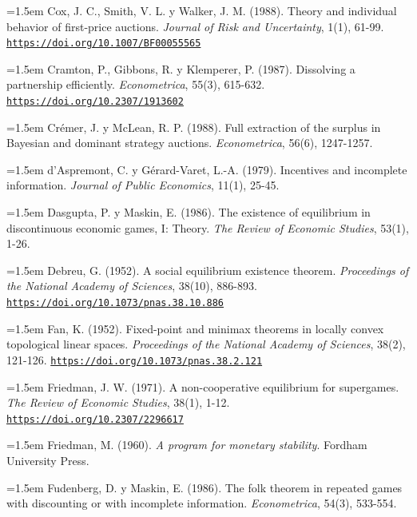 \documentclass[10pt,a4paper]{article}
\begin{document}
\noindent\hangindent=1.5em Cox, J. C., Smith, V. L. y Walker, J. M. (1988). Theory and individual behavior of first-price auctions. \textit{Journal of Risk and Uncertainty}, 1(1), 61-99. \href{https://doi.org/10.1007/BF00055565}{\nolinkurl{https://doi.org/10.1007/BF00055565}}

\noindent\hangindent=1.5em Cramton, P., Gibbons, R. y Klemperer, P. (1987). Dissolving a partnership efficiently. \textit{Econometrica}, 55(3), 615-632. \href{https://doi.org/10.2307/1913602}{\nolinkurl{https://doi.org/10.2307/1913602}}

\noindent\hangindent=1.5em Crémer, J. y McLean, R. P. (1988). Full extraction of the surplus in Bayesian and dominant strategy auctions. \textit{Econometrica}, 56(6), 1247-1257.

\noindent\hangindent=1.5em d’Aspremont, C. y Gérard-Varet, L.-A. (1979). Incentives and incomplete information. \textit{Journal of Public Economics}, 11(1), 25-45.

\noindent\hangindent=1.5em Dasgupta, P. y Maskin, E. (1986). The existence of equilibrium in discontinuous economic games, I: Theory. \textit{The Review of Economic Studies}, 53(1), 1-26.

\noindent\hangindent=1.5em Debreu, G. (1952). A social equilibrium existence theorem. \textit{Proceedings of the National Academy of Sciences}, 38(10), 886-893. \href{https://doi.org/10.1073/pnas.38.10.886}{\nolinkurl{https://doi.org/10.1073/pnas.38.10.886}}

\noindent\hangindent=1.5em Fan, K. (1952). Fixed-point and minimax theorems in locally convex topological linear spaces. \textit{Proceedings of the National Academy of Sciences}, 38(2), 121-126. \href{https://doi.org/10.1073/pnas.38.2.121}{\nolinkurl{https://doi.org/10.1073/pnas.38.2.121}}

\noindent\hangindent=1.5em Friedman, J. W. (1971). A non-cooperative equilibrium for supergames. \textit{The Review of Economic Studies}, 38(1), 1-12. \href{https://doi.org/10.2307/2296617}{\nolinkurl{https://doi.org/10.2307/2296617}}

\noindent\hangindent=1.5em Friedman, M. (1960). \textit{A program for monetary stability}. Fordham University Press.

\noindent\hangindent=1.5em Fudenberg, D. y Maskin, E. (1986). The folk theorem in repeated games with discounting or with incomplete information. \textit{Econometrica}, 54(3), 533-554.
\end{document}
